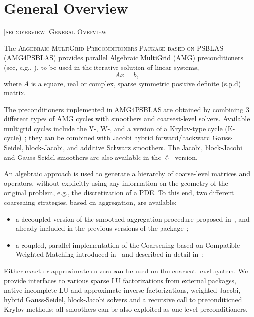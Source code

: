 \section{General Overview\label{sec:overview}}
         {\textsc{\ref{sec:overview} General Overview}}

The \textsc{Algebraic MultiGrid Preconditioners Package based on
PSBLAS (AMG4PSBLAS)} provides parallel Algebraic MultiGrid (AMG) preconditioners (see, e.g., \cite{Briggs2000,Stuben_01}),
to be used in the iterative solution of  linear systems,
\begin{equation}
Ax=b,
\label{system1}
\end{equation}
where $A$ is a square, real or complex, sparse symmetric positive definite (s.p.d) matrix.
%
%

The preconditioners implemented in AMG4PSBLAS are obtained by combining
3 different types of AMG cycles with smoothers and coarsest-level
solvers. Available multigrid cycles include the V-, W-, and a version of a Krylov-type cycle
(K-cycle)~\cite{Briggs2000,Notay2008}; they can  be
combined with Jacobi hybrid 
forward/backward Gauss-Seidel, block-Jacobi, and additive Schwarz
smoothers. The  Jacobi, block-Jacobi and
Gauss-Seidel smoothers are also available in the $\ell_1$  version.

An algebraic approach is used to generate a hierarchy of
coarse-level matrices and operators, without explicitly using any information on the
geometry of the original problem, e.g., the discretization of a PDE. To this end,
two different coarsening strategies, based on aggregation, are available:
\begin{itemize}
\item a decoupled version of the  smoothed aggregation procedure
  proposed in~\cite{BREZINA_VANEK,VANEK_MANDEL_BREZINA}, and already
  included in the previous versions of the
  package~\cite{BDDF2007,MLD2P4_TOMS}; 
\item a coupled,  parallel implementation of the  Coarsening based on
  Compatible Weighted Matching introduced   in~\cite{DV2013,DFV2018}
  and described in detail in~\cite{DDF2020};  
\end{itemize}
Either exact or approximate solvers can be used on the coarsest-level
system. We provide interfaces to various  sparse LU factorizations from external 
packages, native incomplete LU and approximate inverse factorizations,
weighted Jacobi, hybrid Gauss-Seidel, block-Jacobi solvers and
a recursive call to preconditioned Krylov methods;  all 
smoothers can be also exploited as one-level preconditioners.

